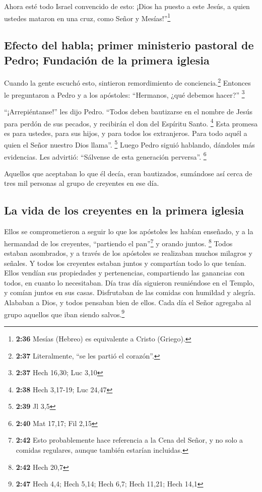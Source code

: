  Ahora esté todo Israel convencido de esto: ¡Dios ha
puesto a este Jesús, a quien ustedes mataron en una cruz, como Señor y
Mesías!''\footnote{\textbf{2:36} Mesías (Hebreo) es equivalente a Cristo
  (Griego).}

\hypertarget{efecto-del-habla-primer-ministerio-pastoral-de-pedro-fundaciuxf3n-de-la-primera-iglesia}{%
\subsection{Efecto del habla; primer ministerio pastoral de Pedro;
Fundación de la primera
iglesia}\label{efecto-del-habla-primer-ministerio-pastoral-de-pedro-fundaciuxf3n-de-la-primera-iglesia}}

 Cuando la gente escuchó esto, sintieron remordimiento de
conciencia.\footnote{\textbf{2:37} Literalmente, ``se les partió el
  corazón''.} Entonces le preguntaron a Pedro y a los apóstoles:
``Hermanos, ¿qué debemos hacer?'' \footnote{\textbf{2:37} Hech 16,30;
  Luc 3,10}

 ``¡Arrepiéntanse!'' les dijo Pedro. ``Todos deben
bautizarse en el nombre de Jesús para perdón de sus pecados, y recibirán
el don del Espíritu Santo. \footnote{\textbf{2:38} Hech 3,17-19; Luc
  24,47}  Esta promesa es para ustedes, para sus hijos, y
para todos los extranjeros. Para todo aquél a quien el Señor nuestro
Dios llama''. \footnote{\textbf{2:39} Jl 3,5}  Luego
Pedro siguió hablando, dándoles más evidencias. Les advirtió: ``Sálvense
de esta generación perversa''. \footnote{\textbf{2:40} Mat 17,17; Fil
  2,15}

 Aquellos que aceptaban lo que él decía, eran bautizados,
sumándose así cerca de tres mil personas al grupo de creyentes en ese
día.

\hypertarget{la-vida-de-los-creyentes-en-la-primera-iglesia}{%
\subsection{La vida de los creyentes en la primera
iglesia}\label{la-vida-de-los-creyentes-en-la-primera-iglesia}}

 Ellos se comprometieron a seguir lo que los apóstoles
les habían enseñado, y a la hermandad de los creyentes, ``partiendo el
pan''\footnote{\textbf{2:42} Esto probablemente hace referencia a la
  Cena del Señor, y no solo a comidas regulares, aunque también estarían
  incluidas.} y orando juntos. \footnote{\textbf{2:42} Hech 20,7}
 Todos estaban asombrados, y a través de los apóstoles se
realizaban muchos milagros y señales.  Y todos los
creyentes estaban juntos y compartían todo lo que tenían.
 Ellos vendían sus propiedades y pertenencias,
compartiendo las ganancias con todos, en cuanto lo necesitaban.
 Día tras día siguieron reuniéndose en el Templo, y
comían juntos en sus casas. Disfrutaban de las comidas con humildad y
alegría. Alababan a Dios, y todos pensaban bien de ellos.
 Cada día el Señor agregaba al grupo aquellos que iban
siendo salvos.\footnote{\textbf{2:47} Hech 4,4; Hech 5,14; Hech 6,7;
  Hech 11,21; Hech 14,1}

